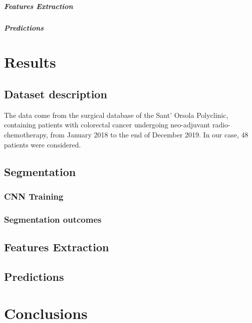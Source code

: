 \documentclass[12pt,a4paper]{report}
\begin{document}
\paragraph{Features Extraction}
\paragraph{Predictions}



\chapter{Results}

\section{Dataset description}

The data come from the surgical database of the Sant' Orsola Polyclinic, containing patients with colorectal cancer undergoing neo-adjuvant radio-chemotherapy, from January 2018 to the end of December 2019. In our case, 48 patients were considered.


\section{Segmentation}

\subsection{CNN Training}
\subsection{Segmentation outcomes}

\section{Features Extraction}

\section{Predictions}


\chapter{Conclusions}


\clearpage



\end{document}
